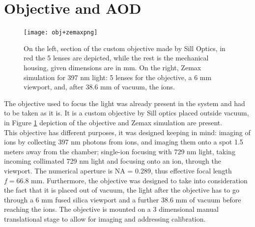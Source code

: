 \section{Objective and AOD}
\label{sec:obj}
%
\begin{figure}[H]
      \centering
          \centering
          \texttt{[image: obj+zemaxpng]}
           \caption{On the left, section of the custom objective made by Sill Optics, in red the 5 lenses are depicted, while the rest is the mechanical housing, given dimensions are in mm. On the right, Zemax simulation for 397 nm light: 5 lenses for the objective, a 6 mm viewport, and, after 38.6 mm of vacuum, the ions.}
          \label{objsection}
\end{figure}
The objective used to focus the light was already present in the system and had to be taken as it is. It is a custom objective by Sill optics placed outside vacuum, in Figure \ref{objsection} depiction of the objective and Zemax simulation are present.\\
This objective has different purposes, it was designed keeping in mind: imaging of ions by collecting 397 nm photons from ions, and imaging them onto a spot 1.5 meters away from the chamber; single-ion focusing with 729 nm light, taking incoming collimated 729 nm light and focusing onto an ion, through the viewport. The numerical aperture is NA = 0.289, thus effective focal length $f = 66.8$ mm. Furthermore, the objective was designed to take into consideration the fact that it is placed out of vacuum, the light after the objective has to go through a 6 mm fused silica viewport and a further 38.6 mm of vacuum before reaching the ions. The objective is mounted on a 3 dimensional manual translational stage to allow for imaging and addressing calibration.\\
